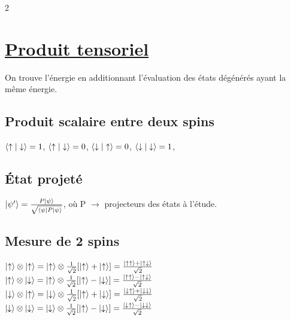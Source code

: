 \documentclass[11pt]{article}
\begin{document}
\begin{multicols}{2}
  \section{\underline{Produit tensoriel}}
  On trouve l'énergie en additionnant l'évaluation des états dégénérés ayant la même énergie.

  \subsection{Produit scalaire entre deux spins}
  $\braket{\uparrow|\downarrow}=1$,
  $\braket{\uparrow|\downarrow}=0$,
  $\braket{\downarrow|\uparrow}=0$,
  $\braket{\downarrow|\downarrow}=1$,

  \subsection{État projeté}
  $\ket{\psi'}=\frac{P\ket{\psi}}{\sqrt{\braket{\psi|P|\psi}}}$, où P $\rightarrow$ projecteurs des états à l'étude.
  \subsection{Mesure de 2 spins}
  $\ket{\uparrow}\otimes\ket{\uparrow} = \ket{\uparrow}\otimes\frac{1}{\sqrt{2}}[\ket{\uparrow}+\ket{\uparrow}] = \frac{\ket{\uparrow\uparrow}+\ket{\uparrow\downarrow}}{\sqrt{2}}$\\
  $\ket{\uparrow}\otimes\ket{\downarrow} = \ket{\uparrow}\otimes\frac{1}{\sqrt{2}}[\ket{\uparrow}-\ket{\downarrow}] = \frac{\ket{\uparrow\uparrow}-\ket{\uparrow\downarrow}}{\sqrt{2}}$\\
  $\ket{\downarrow}\otimes\ket{\uparrow} = \ket{\downarrow}\otimes\frac{1}{\sqrt{2}}[\ket{\uparrow}+\ket{\downarrow}] = \frac{\ket{\downarrow\uparrow}+\ket{\downarrow\downarrow}}{\sqrt{2}}$\\
  $\ket{\downarrow}\otimes\ket{\downarrow} = \ket{\downarrow}\otimes\frac{1}{\sqrt{2}}[\ket{\uparrow}-\ket{\downarrow}] = \frac{\ket{\downarrow\uparrow}-\ket{\downarrow\downarrow}}{\sqrt{2}}$\\


\end{multicols}
\end{document}
